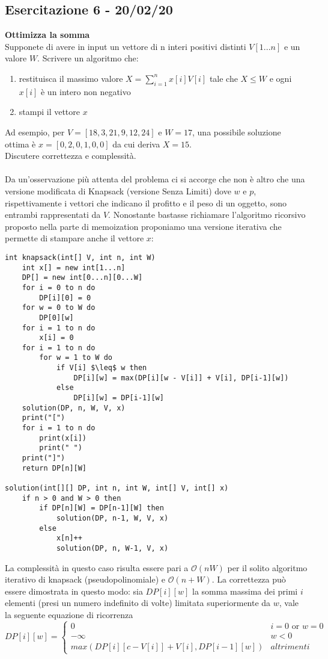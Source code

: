 \documentclass[../cheatSheetAlgoritmi.tex]{subfiles}
\begin{document}
\subsection{Esercitazione 6 - 20/02/20}
\textbf{Ottimizza la somma}\\
Supponete di avere in input un vettore di n interi positivi distinti $V[1. . . n]$ e un valore $W$. Scrivere un algoritmo che:
\begin{enumerate}
	\item restituisca il massimo valore $X =  \sum_{i = 1}^{n} x[i] V[i]$ tale che $X \leq W$ e ogni $x[i]$ è un intero non negativo
	\item stampi il vettore $x$
\end{enumerate}
Ad esempio, per $V = [18,3,21,9,12,24]$ e $W = 17$, una possibile soluzione ottima è $x = [0,2,0,1,0,0]$ da cui deriva $X= 15$.\\
Discutere correttezza e complessità.\\\\
Da un'osservazione più attenta del problema ci si accorge che non è altro che una versione modificata di Knapsack (versione Senza Limiti) dove $w$ e $p$, rispettivamente i vettori che indicano il profitto e il peso di un oggetto, sono entrambi rappresentati da $V$. Nonostante bastasse richiamare l'algoritmo ricorsivo proposto nella parte di memoization proponiamo una versione iterativa che permette di stampare anche il vettore $x$:\\
\begin{lstlisting}[caption=Ottimizza la Somma]
int knapsack(int[] V, int n, int W)
	int x[] = new int[1...n]
	DP[] = new int[0...n][0...W]
	for i = 0 to n do
		DP[i][0] = 0
	for w = 0 to W do
		DP[0][w]
	for i = 1 to n do
		x[i] = 0
	for i = 1 to n do
		for w = 1 to W do
			if V[i] $\leq$ w then
				DP[i][w] = max(DP[i][w - V[i]] + V[i], DP[i-1][w])
			else
				DP[i][w] = DP[i-1][w]
	solution(DP, n, W, V, x)
	print("[")
	for i = 1 to n do
		print(x[i])
		print(" ")
	print("]")
	return DP[n][W]
	
solution(int[][] DP, int n, int W, int[] V, int[] x)
	if n > 0 and W > 0 then
		if DP[n][W] = DP[n-1][W] then
			solution(DP, n-1, W, V, x)
		else
			x[n]++
			solution(DP, n, W-1, V, x)
\end{lstlisting}
La complessità in questo caso risulta essere pari a $\mathcal{O}(nW)$ per il solito algoritmo iterativo di knapsack (pseudopolinomiale) e $\mathcal{O}(n + W)$. La correttezza può essere dimostrata in questo modo: sia $DP[i][w]$ la somma massima dei primi $i$ elementi (presi un numero indefinito di volte) limitata superiormente da $w$, vale la seguente equazione di ricorrenza
\begin{equation*}
  	DP[i][w] =\begin{cases}
    	0 & \text{$i = 0$  or  $w = 0$}\\
    	-\infty & \text{$w < 0$}\\
    	max(DP[i][c-V[i]]+V[i], DP[i-1][w]) & \text{$altrimenti$}
  	\end{cases}
\end{equation*} \\\\
\end{document}
